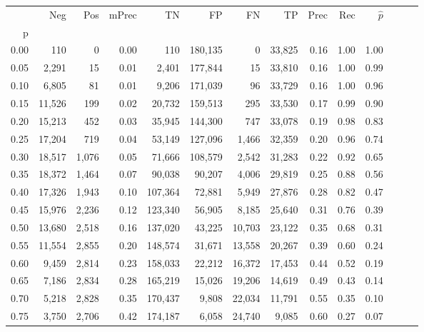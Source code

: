 \begin{tabular}{rrrrrrrrrrrrrr}
\toprule
{} &     Neg &    Pos & mPrec &       TN &       FP &      FN &      TP &  Prec &   Rec & $\hat{p}$ \\
p    &         &        &       &          &          &         &         &       &       &           \\
\midrule
0.00 &     110 &      0 &  0.00 &      110 &  180,135 &       0 &  33,825 &  0.16 &  1.00 &      1.00 \\
0.05 &   2,291 &     15 &  0.01 &    2,401 &  177,844 &      15 &  33,810 &  0.16 &  1.00 &      0.99 \\
0.10 &   6,805 &     81 &  0.01 &    9,206 &  171,039 &      96 &  33,729 &  0.16 &  1.00 &      0.96 \\
0.15 &  11,526 &    199 &  0.02 &   20,732 &  159,513 &     295 &  33,530 &  0.17 &  0.99 &      0.90 \\
0.20 &  15,213 &    452 &  0.03 &   35,945 &  144,300 &     747 &  33,078 &  0.19 &  0.98 &      0.83 \\
0.25 &  17,204 &    719 &  0.04 &   53,149 &  127,096 &   1,466 &  32,359 &  0.20 &  0.96 &      0.74 \\
0.30 &  18,517 &  1,076 &  0.05 &   71,666 &  108,579 &   2,542 &  31,283 &  0.22 &  0.92 &      0.65 \\
0.35 &  18,372 &  1,464 &  0.07 &   90,038 &   90,207 &   4,006 &  29,819 &  0.25 &  0.88 &      0.56 \\
0.40 &  17,326 &  1,943 &  0.10 &  107,364 &   72,881 &   5,949 &  27,876 &  0.28 &  0.82 &      0.47 \\
0.45 &  15,976 &  2,236 &  0.12 &  123,340 &   56,905 &   8,185 &  25,640 &  0.31 &  0.76 &      0.39 \\
0.50 &  13,680 &  2,518 &  0.16 &  137,020 &   43,225 &  10,703 &  23,122 &  0.35 &  0.68 &      0.31 \\
0.55 &  11,554 &  2,855 &  0.20 &  148,574 &   31,671 &  13,558 &  20,267 &  0.39 &  0.60 &      0.24 \\
0.60 &   9,459 &  2,814 &  0.23 &  158,033 &   22,212 &  16,372 &  17,453 &  0.44 &  0.52 &      0.19 \\
0.65 &   7,186 &  2,834 &  0.28 &  165,219 &   15,026 &  19,206 &  14,619 &  0.49 &  0.43 &      0.14 \\
0.70 &   5,218 &  2,828 &  0.35 &  170,437 &    9,808 &  22,034 &  11,791 &  0.55 &  0.35 &      0.10 \\
0.75 &   3,750 &  2,706 &  0.42 &  174,187 &    6,058 &  24,740 &   9,085 &  0.60 &  0.27 &      0.07 \\

\end{tabular}
